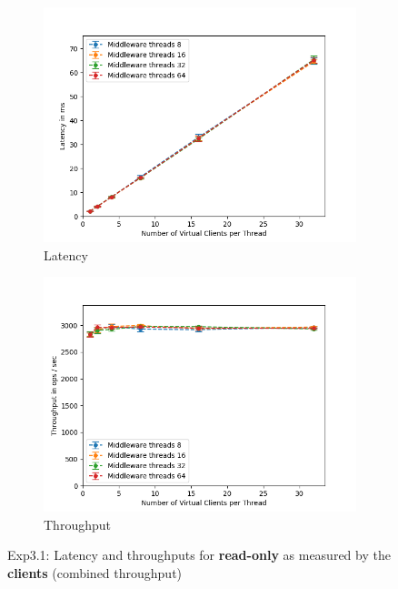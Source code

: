 \documentclass[11pt,a4paper]{article}
\begin{document}
\begin{figure}[H]
\centering
\begin{subfigure}{.5\textwidth}
    \centering
    \includegraphics[width=\textwidth]{img/exp3_1/exp3_1__latency_client_write_0.png}
    \caption{Latency}
    \label{fig:mesh1}
\end{subfigure}%
\begin{subfigure}{.5\textwidth}
      \centering
    \includegraphics[width=\textwidth]{img/exp3_1/exp3_1__throughput_client_write_0.png}
    \caption{Throughput}
    \label{fig:mesh1}
\end{subfigure}
\caption{Exp3.1: Latency and throughputs for \textbf{read-only} as measured by the \textbf{clients} (combined throughput)}
\label{fig:test}
\end{figure}
\end{document}
